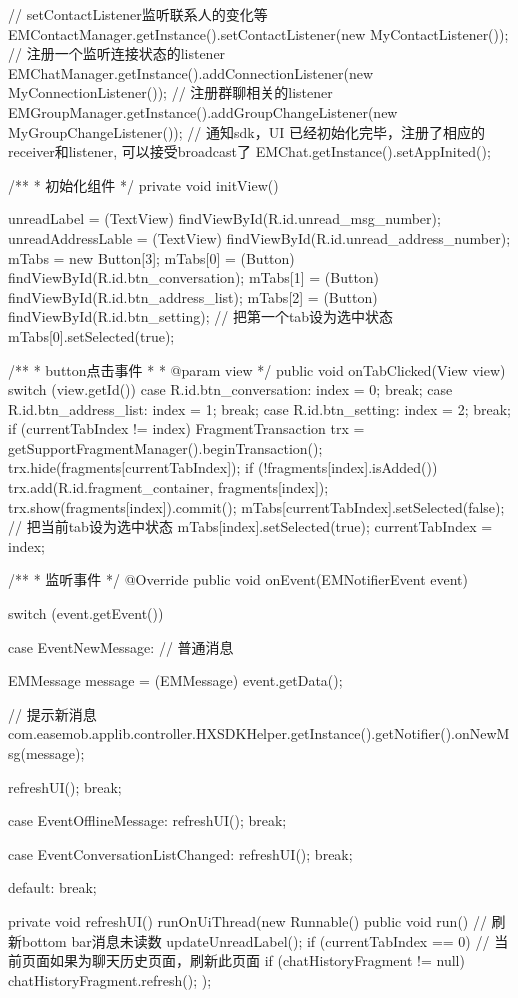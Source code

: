 {{		// setContactListener监听联系人的变化等
		EMContactManager.getInstance().setContactListener(new MyContactListener());
		// 注册一个监听连接状态的listener
		EMChatManager.getInstance().addConnectionListener(new MyConnectionListener());
		// 注册群聊相关的listener
		EMGroupManager.getInstance().addGroupChangeListener(new MyGroupChangeListener());
		// 通知sdk，UI 已经初始化完毕，注册了相应的receiver和listener, 可以接受broadcast了
		EMChat.getInstance().setAppInited();
	}

	/**
	 * 初始化组件
	 */
	private void initView() {
		unreadLabel = (TextView) findViewById(R.id.unread_msg_number);
		unreadAddressLable = (TextView) findViewById(R.id.unread_address_number);
		mTabs = new Button[3];
		mTabs[0] = (Button) findViewById(R.id.btn_conversation);
		mTabs[1] = (Button) findViewById(R.id.btn_address_list);
		mTabs[2] = (Button) findViewById(R.id.btn_setting);
		// 把第一个tab设为选中状态
		mTabs[0].setSelected(true);

	}

	/**
	 * button点击事件
	 * 
	 * @param view
	 */
	public void onTabClicked(View view) {
		switch (view.getId()) {
		case R.id.btn_conversation:
			index = 0;
			break;
		case R.id.btn_address_list:
			index = 1;
			break;
		case R.id.btn_setting:
			index = 2;
			break;
		}
		if (currentTabIndex != index) {
			FragmentTransaction trx = getSupportFragmentManager().beginTransaction();
			trx.hide(fragments[currentTabIndex]);
			if (!fragments[index].isAdded()) {
				trx.add(R.id.fragment_container, fragments[index]);
			}
			trx.show(fragments[index]).commit();
		}
		mTabs[currentTabIndex].setSelected(false);
		// 把当前tab设为选中状态
		mTabs[index].setSelected(true);
		currentTabIndex = index;
	}

	/**
	 * 监听事件
     */
	@Override
	public void onEvent(EMNotifierEvent event) {
		switch (event.getEvent()) {
		case EventNewMessage: // 普通消息
		{
			EMMessage message = (EMMessage) event.getData();

			// 提示新消息
			com.easemob.applib.controller.HXSDKHelper.getInstance().getNotifier().onNewMsg(message);

			refreshUI();
			break;
		}

		case EventOfflineMessage: {
			refreshUI();
			break;
		}

		case EventConversationListChanged: {
		    refreshUI();
		    break;
		}
		
		default:
			break;
		}
	}

	private void refreshUI() {
		runOnUiThread(new Runnable() {
			public void run() {
				// 刷新bottom bar消息未读数
				updateUnreadLabel();
				if (currentTabIndex == 0) {
					// 当前页面如果为聊天历史页面，刷新此页面
					if (chatHistoryFragment != null) {
						chatHistoryFragment.refresh();
					}
				}
			}
		});
	}

}
